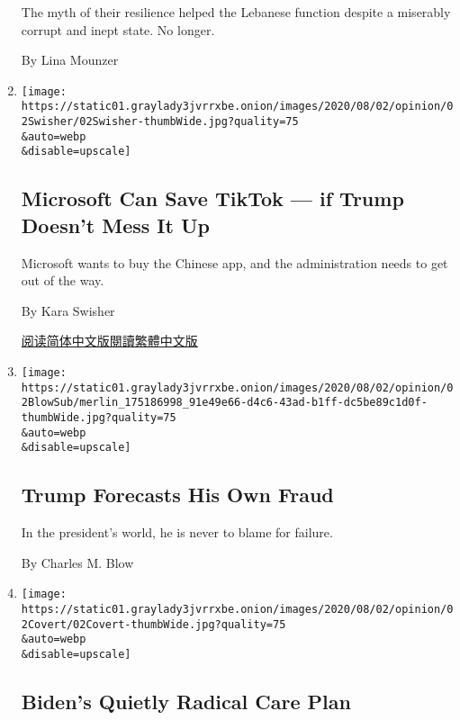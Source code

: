 \begin{enumerate}
  The myth of their resilience helped the Lebanese function despite a
  miserably corrupt and inept state. No longer.

  By Lina Mounzer
\item
  \href{/2020/08/02/opinion/02tik-tok-china-trump.html}{}

  \texttt{[image: https://static01.graylady3jvrrxbe.onion/images/2020/08/02/opinion/02Swisher/02Swisher-thumbWide.jpg?quality=75\\\&auto=webp\\\&disable=upscale]}

  \hypertarget{microsoft-can-save-tiktok--if-trump-doesnt-mess-it-up}{%
  \subsection{Microsoft Can Save TikTok --- if Trump Doesn't Mess It
  Up}\label{microsoft-can-save-tiktok--if-trump-doesnt-mess-it-up}}

  Microsoft wants to buy the Chinese app, and the administration needs
  to get out of the way.

  By Kara Swisher

  \href{https://cn.nytimes3xbfgragh.onion/opinion/20200804/tik-tok-china-trump/}{阅读简体中文版}\href{https://cn.nytimes3xbfgragh.onion/opinion/20200804/tik-tok-china-trump/zh-hant/}{閱讀繁體中文版}
\item
  \href{/2020/08/02/opinion/trump-2020-election.html}{}

  \texttt{[image: https://static01.graylady3jvrrxbe.onion/images/2020/08/02/opinion/02BlowSub/merlin\_175186998\_91e49e66-d4c6-43ad-b1ff-dc5be89c1d0f-thumbWide.jpg?quality=75\\\&auto=webp\\\&disable=upscale]}

  \hypertarget{trump-forecasts-his-own-fraud}{%
  \subsection{Trump Forecasts His Own
  Fraud}\label{trump-forecasts-his-own-fraud}}

  In the president's world, he is never to blame for failure.

  By Charles M. Blow
\item
  \href{/2020/08/02/opinion/biden-child-care.html}{}

  \texttt{[image: https://static01.graylady3jvrrxbe.onion/images/2020/08/02/opinion/02Covert/02Covert-thumbWide.jpg?quality=75\\\&auto=webp\\\&disable=upscale]}

  \hypertarget{bidens-quietly-radical-care-plan}{%
  \subsection{Biden's Quietly Radical Care
  Plan}\label{bidens-quietly-radical-care-plan}}


\end{enumerate}
